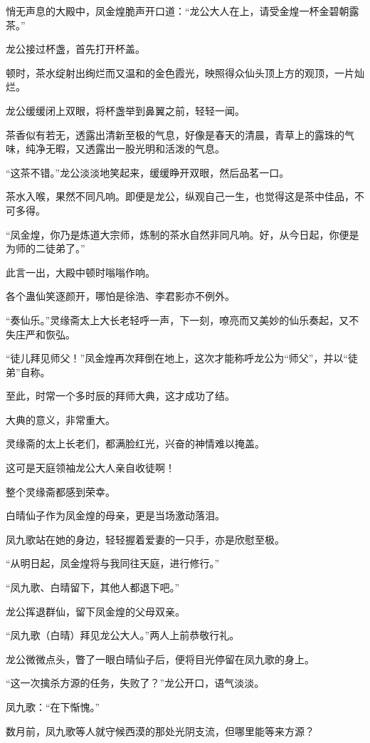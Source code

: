 \begin{this_body}
悄无声息的大殿中，凤金煌脆声开口道：“龙公大人在上，请受金煌一杯金碧朝露茶。”

龙公接过杯盏，首先打开杯盖。

顿时，茶水绽射出绚烂而又温和的金色霞光，映照得众仙头顶上方的观顶，一片灿烂。

龙公缓缓闭上双眼，将杯盏举到鼻翼之前，轻轻一闻。

茶香似有若无，透露出清新至极的气息，好像是春天的清晨，青草上的露珠的气味，纯净无暇，又透露出一股光明和活泼的气息。

“这茶不错。”龙公淡淡地笑起来，缓缓睁开双眼，然后品茗一口。

茶水入喉，果然不同凡响。即便是龙公，纵观自己一生，也觉得这是茶中佳品，不可多得。

“凤金煌，你乃是炼道大宗师，炼制的茶水自然非同凡响。好，从今日起，你便是为师的二徒弟了。”

此言一出，大殿中顿时嗡嗡作响。

各个蛊仙笑逐颜开，哪怕是徐浩、李君影亦不例外。

“奏仙乐。”灵缘斋太上大长老轻呼一声，下一刻，嘹亮而又美妙的仙乐奏起，又不失庄严和恢弘。

“徒儿拜见师父！”凤金煌再次拜倒在地上，这次才能称呼龙公为“师父”，并以“徒弟”自称。

至此，时常一个多时辰的拜师大典，这才成功了结。

大典的意义，非常重大。

灵缘斋的太上长老们，都满脸红光，兴奋的神情难以掩盖。

这可是天庭领袖龙公大人亲自收徒啊！

整个灵缘斋都感到荣幸。

白晴仙子作为凤金煌的母亲，更是当场激动落泪。

凤九歌站在她的身边，轻轻握着爱妻的一只手，亦是欣慰至极。

“从明日起，凤金煌将与我同往天庭，进行修行。”

“凤九歌、白晴留下，其他人都退下吧。”

龙公挥退群仙，留下凤金煌的父母双亲。

“凤九歌（白晴）拜见龙公大人。”两人上前恭敬行礼。

龙公微微点头，瞥了一眼白晴仙子后，便将目光停留在凤九歌的身上。

“这一次擒杀方源的任务，失败了？”龙公开口，语气淡淡。

凤九歌：“在下惭愧。”

数月前，凤九歌等人就守候西漠的那处光阴支流，但哪里能等来方源？


\end{this_body}
